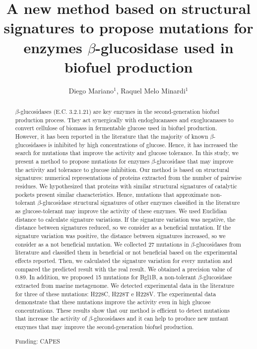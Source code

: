 \documentclass[twoside]{article}
\title{\vspace{-15mm}\fontsize{24pt}{10pt}\selectfont\textbf{A new method based on structural signatures to propose mutations for enzymes $\beta$-glucosidase used in biofuel production}} %
\author{Diego Mariano$^1$, Raquel Melo Minardi$^1$}
\affil{1 UFMG\\ }
\date{}
\begin{document}
\maketitle %

\thispagestyle{fancy} %


\begin{abstract}
$\beta$-glucosidases (E.C. 3.2.1.21) are key enzymes in the second-generation biofuel production process. They act synergically with endoglucanases and exoglucanases to convert cellulose of biomass in fermentable glucose used in biofuel production.
However, it has been reported in the literature that the majority of known $\beta$-glucosidases is inhibited by high concentrations of glucose. Hence, it has increased the search for mutations that improve the activity and glucose tolerance. In this study, we present a method to propose mutations for enzymes $\beta$-glucosidase that may improve the activity and tolerance to glucose inhibition. Our method is
based on structural signatures: numerical representations of proteins extracted from the number of pairwise residues. We hypothesized that proteins with similar structural signatures of catalytic pockets present similar characteristics. Hence, mutations that approximate non-tolerant $\beta$-glucosidase structural signatures of other enzymes classified in the literature as glucose-tolerant may improve the activity of these enzymes. We used Euclidian distance to calculate signature variations. If the signature variation was negative, the distance between signatures reduced, so we consider as a beneficial mutation. If the signature variation was positive, the distance between signatures increased, so we consider as a not beneficial mutation. We collected 27 mutations in $\beta$-glucosidases from literature and classified them in beneficial or not beneficial based on the experimental effects reported. Then, we calculated the signature variation for every mutation and compared the predicted result with the real result. We obtained a precision value of 0.89. In addition, we proposed 15 mutations for Bgl1B, a non-tolerant $\beta$-glucosidase extracted from marine metagenome. We detected experimental data in the literature for three of these mutations: H228C, H228T e H228V. The experimental data demonstrate that these mutations improve the activity even in high glucose concentrations. These results show that our method is efficient to detect mutations that increase the activity of $\beta$-glucosidases and it can help to produce new mutant enzymes that may improve the second-generation biofuel production.

Funding: CAPES
\end{abstract}
\end{document}
